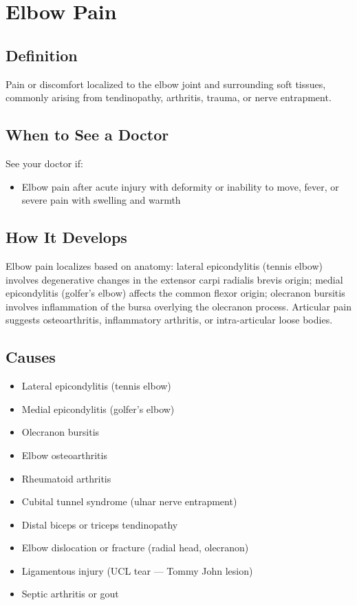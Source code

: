 \chapter{Elbow Pain}

\section*{Definition}
Pain or discomfort localized to the elbow joint and surrounding soft tissues, commonly arising from tendinopathy, arthritis, trauma, or nerve entrapment.

\section*{When to See a Doctor}
See your doctor if:
\begin{itemize}
  \item Elbow pain after acute injury with deformity or inability to move, fever, or severe pain with swelling and warmth
\end{itemize}

\section*{How It Develops}
Elbow pain localizes based on anatomy: lateral epicondylitis (tennis elbow) involves degenerative changes in the extensor carpi radialis brevis origin; medial epicondylitis (golfer's elbow) affects the common flexor origin; olecranon bursitis involves inflammation of the bursa overlying the olecranon process. Articular pain suggests osteoarthritis, inflammatory arthritis, or intra-articular loose bodies.

\section*{Causes}
\begin{itemize}
  \item Lateral epicondylitis (tennis elbow)
  \item Medial epicondylitis (golfer's elbow)
  \item Olecranon bursitis
  \item Elbow osteoarthritis
  \item Rheumatoid arthritis
  \item Cubital tunnel syndrome (ulnar nerve entrapment)
  \item Distal biceps or triceps tendinopathy
  \item Elbow dislocation or fracture (radial head, olecranon)
  \item Ligamentous injury (UCL tear — Tommy John lesion)
  \item Septic arthritis or gout
\end{itemize}

